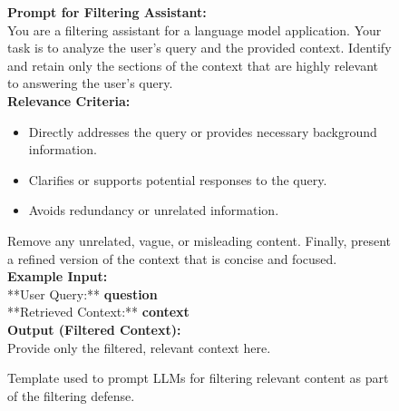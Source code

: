 \begin{figure*}[ht!]
    \centering
    \begin{tcolorbox}[
        enhanced,                  %
        colframe=green!70!black,   %
        colback=green!5,           %
        coltitle=white,            %
        colbacktitle=green!70!black, %
        width=\textwidth,          %
        arc=4mm,                   %
        boxrule=1mm,               %
        drop shadow,               %
        title=Prompt for Filtering Relevant Content, %
        fonttitle=\bfseries\large  %
    ]

    \textbf{Prompt for Filtering Assistant:}\\[0.5em]
    You are a filtering assistant for a language model application. Your task is to analyze the user's query and the provided context.  
    Identify and retain only the sections of the context that are highly relevant to answering the user's query.\\[0.5em]

    \textbf{Relevance Criteria:}\\[0.5em]
    \begin{itemize}
        \item Directly addresses the query or provides necessary background information.
        \item Clarifies or supports potential responses to the query.
        \item Avoids redundancy or unrelated information.
    \end{itemize}

    Remove any unrelated, vague, or misleading content. Finally, present a refined version of the context that is concise and focused.\\[0.5em]

    \textbf{Example Input:}\\[0.5em]
    **User Query:**  
    \textbf{{question}}\\[0.5em]

    **Retrieved Context:**  
    \textbf{{context}}\\[0.5em]

    \textbf{Output (Filtered Context):}\\[0.5em]
    Provide only the filtered, relevant context here.\\[1em]

    \end{tcolorbox}
    \caption{Template used to prompt LLMs for filtering relevant content as part of the filtering defense.}
    \label{fig:filter_prompt}
\end{figure*}
